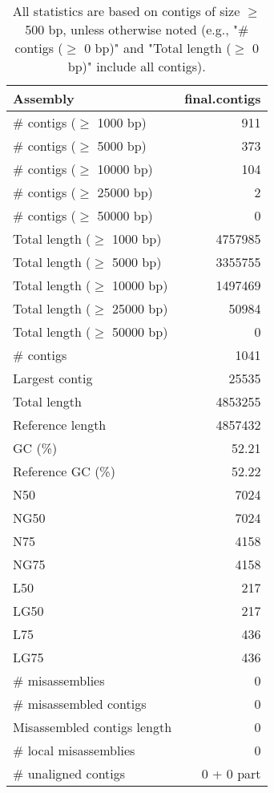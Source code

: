 \documentclass[12pt,a4paper]{article}
\begin{document}
\begin{table}[ht]
\begin{center}
\caption{All statistics are based on contigs of size $\geq$ 500 bp, unless otherwise noted (e.g., "\# contigs ($\geq$ 0 bp)" and "Total length ($\geq$ 0 bp)" include all contigs).}
\begin{tabular}{|l*{1}{|r}|}
\hline
Assembly & final.contigs \\ \hline
\# contigs ($\geq$ 1000 bp) & 911 \\ \hline
\# contigs ($\geq$ 5000 bp) & 373 \\ \hline
\# contigs ($\geq$ 10000 bp) & 104 \\ \hline
\# contigs ($\geq$ 25000 bp) & 2 \\ \hline
\# contigs ($\geq$ 50000 bp) & 0 \\ \hline
Total length ($\geq$ 1000 bp) & 4757985 \\ \hline
Total length ($\geq$ 5000 bp) & 3355755 \\ \hline
Total length ($\geq$ 10000 bp) & 1497469 \\ \hline
Total length ($\geq$ 25000 bp) & 50984 \\ \hline
Total length ($\geq$ 50000 bp) & 0 \\ \hline
\# contigs & 1041 \\ \hline
Largest contig & 25535 \\ \hline
Total length & 4853255 \\ \hline
Reference length & 4857432 \\ \hline
GC (\%) & 52.21 \\ \hline
Reference GC (\%) & 52.22 \\ \hline
N50 & 7024 \\ \hline
NG50 & 7024 \\ \hline
N75 & 4158 \\ \hline
NG75 & 4158 \\ \hline
L50 & 217 \\ \hline
LG50 & 217 \\ \hline
L75 & 436 \\ \hline
LG75 & 436 \\ \hline
\# misassemblies & 0 \\ \hline
\# misassembled contigs & 0 \\ \hline
Misassembled contigs length & 0 \\ \hline
\# local misassemblies & 0 \\ \hline
\# unaligned contigs & 0 + 0 part \\ \hline

\end{tabular}
\end{center}
\end{table}
\end{document}
